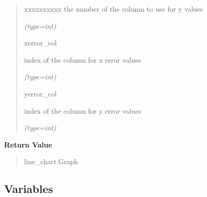 \begin{boxedminipage}{\funcwidth}
\begin{quote}
\begin{Ventry}{xxxxxxxxxx}
          the number of the column to use for y values

            {\it (type=int)}

          \item[xerror\_col]

          index of the column for x error values

            {\it (type=int)}

          \item[yerror\_col]

          index of the column for y error values

            {\it (type=int)}

        \end{Ventry}

      \end{quote}

      \textbf{Return Value}
    \vspace{-1ex}

      \begin{quote}
      line\_chart.Graph

      \end{quote}

    \end{boxedminipage}



  \subsection{Variables}

